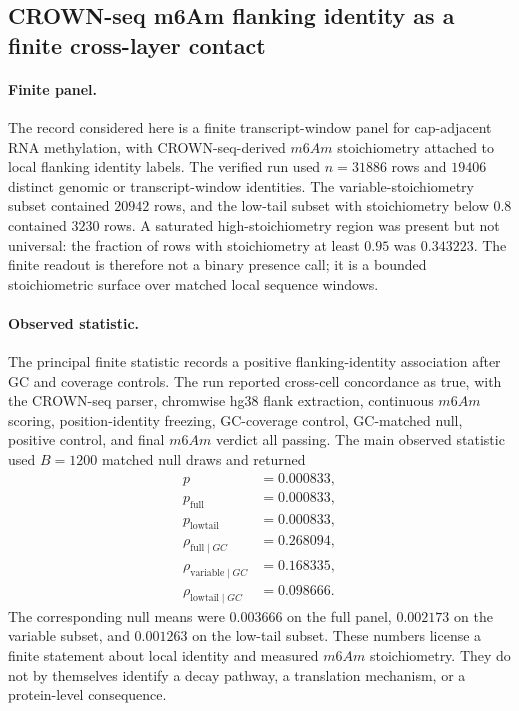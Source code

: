 
\subsection{CROWN-seq m6Am flanking identity as a finite cross-layer contact}
\label{sec:bioreality-m6am-flanking-identity-crownseq}

\paragraph{Finite panel.}
The record considered here is a finite transcript-window panel for cap-adjacent RNA methylation, with CROWN-seq-derived $m6Am$ stoichiometry attached to local flanking identity labels.  The verified run used $n=31886$ rows and $19406$ distinct genomic or transcript-window identities.  The variable-stoichiometry subset contained $20942$ rows, and the low-tail subset with stoichiometry below $0.8$ contained $3230$ rows.  A saturated high-stoichiometry region was present but not universal: the fraction of rows with stoichiometry at least $0.95$ was $0.343223$.  The finite readout is therefore not a binary presence call; it is a bounded stoichiometric surface over matched local sequence windows.

\paragraph{Observed statistic.}
The principal finite statistic records a positive flanking-identity association after GC and coverage controls.  The run reported cross-cell concordance as true, with the CROWN-seq parser, chromwise hg38 flank extraction, continuous $m6Am$ scoring, position-identity freezing, GC-coverage control, GC-matched null, positive control, and final $m6Am$ verdict all passing.  The main observed statistic used $B=1200$ matched null draws and returned
$$
\begin{aligned}
  p &= 0.000833,\\
  p_{\mathrm{full}} &= 0.000833,\\
  p_{\mathrm{lowtail}} &= 0.000833,\\
  \rho_{\mathrm{full}\mid GC} &= 0.268094,\\
  \rho_{\mathrm{variable}\mid GC} &= 0.168335,\\
  \rho_{\mathrm{lowtail}\mid GC} &= 0.098666.
\end{aligned}
$$
The corresponding null means were $0.003666$ on the full panel, $0.002173$ on the variable subset, and $0.001263$ on the low-tail subset.  These numbers license a finite statement about local identity and measured $m6Am$ stoichiometry.  They do not by themselves identify a decay pathway, a translation mechanism, or a protein-level consequence.

